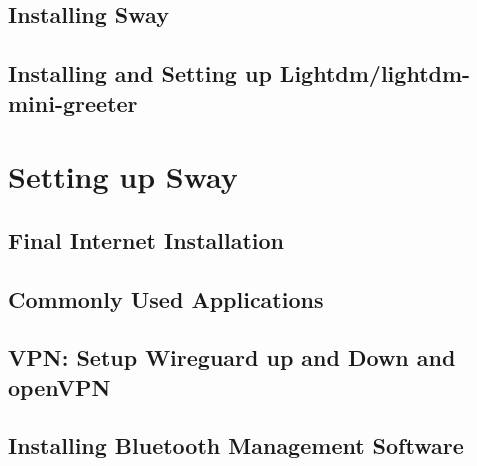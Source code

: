 \subsection{Installing Sway}






\subsection{Installing and Setting up Lightdm/lightdm-mini-greeter}

\section{Setting up Sway}
\subsection{Final Internet Installation}
\subsection{Commonly Used Applications}
\subsection{VPN: Setup Wireguard up and Down and openVPN}
\subsection{Installing Bluetooth Management Software}
